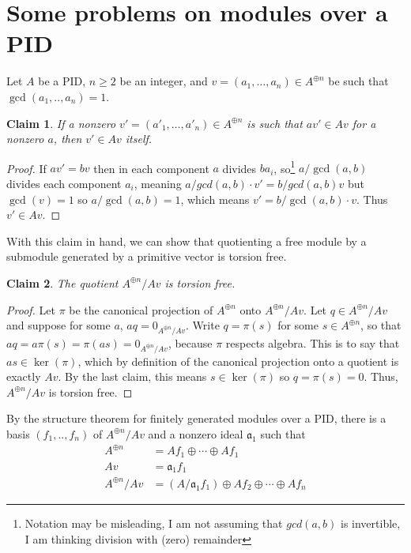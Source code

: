 \documentclass[18pt]{amsart}
\newtheorem{claim}{Claim}
\begin{document}
\section{Some problems on modules over a PID}
Let $A$ be a PID, $n \geq 2$ be an integer, and $v=(a_1,\ldots,a_n) \in A^{\oplus n}$ be such that $\gcd(a_1,..,a_n)=1$.
	\begin{claim}
		If a nonzero $v'=(a'_1,\ldots,a'_n) \in A^{\oplus n}$ is such that $av'\in Av$ for a nonzero $a$, then $v' \in Av$ itself.
	\end{claim}
	\begin{proof}
		If $av'=bv$ then in each component $a$ divides $ba_i$, so\footnote{Notation may be misleading, I am not assuming that $gcd(a,b)$ is invertible, I am thinking division with (zero) remainder} $a/\gcd(a,b)$ divides each component $a_i$, meaning $a/gcd(a,b) \cdot v' = b/gcd(a,b) v$ but $\gcd(v)=1$ so $a/\gcd(a,b)=1$, which means $v'=b/\gcd(a,b)\cdot v$. Thus $v' \in Av$. 
	\end{proof}
	With this claim in hand, we can show that quotienting a free module by a submodule generated by a primitive vector is torsion free.
	\begin{claim}
		The quotient $A^{\oplus n}/Av$ is torsion free.
	\end{claim}
	\begin{proof}
		Let $\pi$ be the canonical projection of $A^{\oplus n}$ onto $A^{\oplus n}/Av$. Let $q \in A^{\oplus n}/Av$ and suppose for some $a$, $aq=0_{A^{\oplus n}/Av}$. Write $q=\pi(s)$ for some $s \in A^{\oplus n}$, so that $aq=a\pi(s)=\pi(as)=0_{A^{\oplus n}/Av}$, because $\pi$ respects algebra. This is to say that $as \in \ker(\pi)$, which by definition of the canonical projection onto a quotient is exactly $Av$. By the last claim, this means $s\in \ker(\pi)$  so $q=\pi(s)=0$. Thus, $A^{\oplus n}/Av$ is torsion free.
	\end{proof}
By the structure theorem for finitely generated modules over a PID, there is a basis $(f_1,..,f_n)$ of $A^{\oplus n}/Av$ and a nonzero ideal $\mathfrak{a}_1$ such that
	\begin{equation*}
	\begin{split}
		A^{\oplus n}       & =Af_1\oplus \cdots \oplus Af_1 \\
		Av                      & = \mathfrak{a}_1f_1 \\
		A^{\oplus n}/Av  & =(A/\mathfrak{a}_1 f_1) \oplus Af_2 \oplus \cdots \oplus Af_n
	\end{split}
	\end{equation*}
\end{document}
